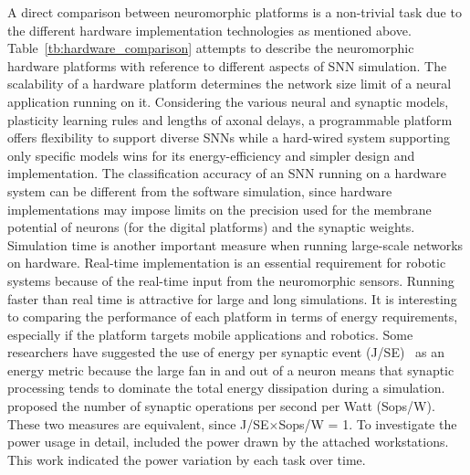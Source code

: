 A direct comparison between neuromorphic platforms is a non-trivial task due to the different hardware implementation technologies as mentioned above.
Table~\ref{tb:hardware_comparison} attempts to describe the neuromorphic hardware platforms with reference to different aspects of SNN simulation.
The scalability of a hardware platform determines the network size limit of a neural application running on it.
Considering the various neural and synaptic models, plasticity learning rules and lengths of axonal delays, a programmable platform offers flexibility to support diverse SNNs while a hard-wired system supporting only specific models wins for its energy-efficiency and simpler design and implementation.
The classification accuracy of an SNN running on a hardware system can be different from the software simulation, since hardware implementations may impose limits on the precision used for the membrane potential of neurons (for the digital platforms) and the synaptic weights.
Simulation time is another important measure when running large-scale networks on hardware.
Real-time implementation is an essential requirement for robotic systems because of the real-time input from the neuromorphic sensors.
Running faster than real time is attractive for large and long simulations.
It is interesting to comparing the performance of each platform in terms of energy requirements, especially if the platform targets mobile applications and robotics.
Some researchers have suggested the use of energy per synaptic event (J/SE)~\cite{sharp2012power,stromatias2013power} as an energy metric because the large fan in and out of a neuron means that synaptic processing tends to dominate the total energy dissipation during a simulation.
\cite{merolla2014million} proposed the number of synaptic operations per second per Watt (Sops/W).
These two measures are equivalent, since J/SE$\times$Sops/W = 1.
To investigate the power usage in detail, \cite{Diamond2016comparing} included the power drawn by the attached workstations.
This work indicated the power variation by each task over time.

